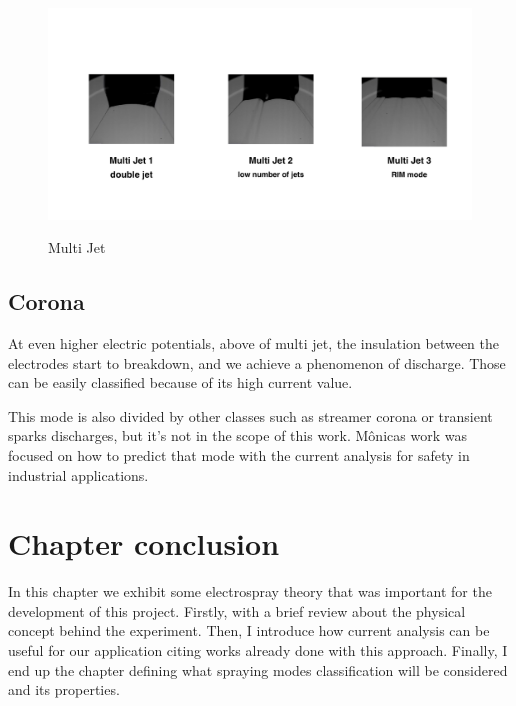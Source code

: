   \begin{figure}[H]
      \center
      \includegraphics[width=15cm]{Figuras/april/multjt.png}
      \label{fig:multijt}
      \caption{Multi Jet}
  \end{figure}



\subsection{Corona}
\label{subsec:Corona}

At even higher electric potentials, above of multi jet, the insulation between the electrodes start to breakdown, and we achieve a phenomenon of discharge.
Those can be easily classified because of its high current value. 

This mode is also divided by other classes such as streamer corona or transient sparks discharges, but it's not in the scope of this work. 
Mônicas\cite{Monica} work was focused on how to predict that mode with the current analysis for safety in industrial applications.



\section{Chapter conclusion}

In this chapter we exhibit some electrospray theory that was important for the development of this project. 
Firstly, with a brief review about the physical concept behind the experiment. 
Then, I introduce how current analysis can be useful for our application citing works already done with this approach.
Finally, I end up the chapter defining what spraying modes classification will be considered and its properties.

\clearpage